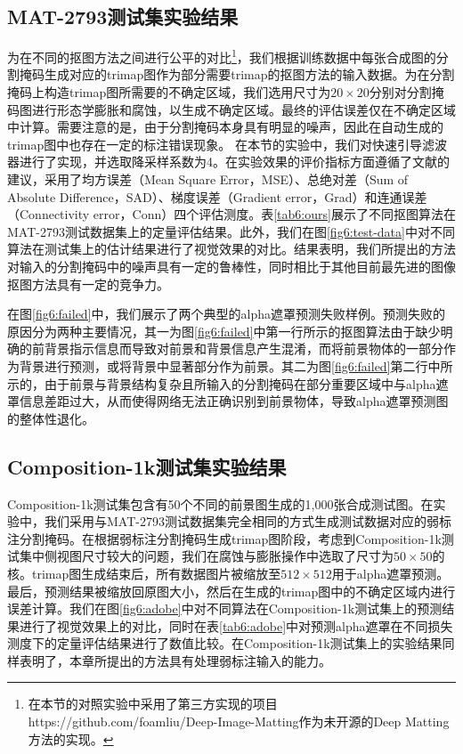 \subsection{MAT-2793测试集实验结果}
为在不同的抠图方法之间进行公平的对比\footnote{在本节的对照实验中采用了第三方实现的项目https://github.com/foamliu/Deep-Image-Matting作为未开源的Deep Matting方法的实现。}，我们根据训练数据中每张合成图的分割掩码生成对应的trimap图作为部分需要trimap的抠图方法的输入数据。为在分割掩码上构造trimap图所需要的不确定区域，我们选用尺寸为$20\times20$分别对分割掩码图进行形态学膨胀和腐蚀，以生成不确定区域。最终的评估误差仅在不确定区域中计算。需要注意的是，由于分割掩码本身具有明显的噪声，因此在自动生成的trimap图中也存在一定的标注错误现象。
在本节的实验中，我们对快速引导滤波器\cite{he2015fast}进行了实现，并选取降采样系数为4。在实验效果的评价指标方面遵循了文献\parencite{rhemann2009perceptually}的建议，采用了均方误差（Mean Square Error，MSE）、总绝对差（Sum of Absolute Difference，SAD）、梯度误差（Gradient error，Grad）和连通误差（Connectivity error，Conn）四个评估测度。表\ref{tab6:ours}展示了不同抠图算法在MAT-2793测试数据集上的定量评估结果。此外，我们在图\ref{fig6:test-data}中对不同算法在测试集上的估计结果进行了视觉效果的对比。结果表明，我们所提出的方法对输入的分割掩码中的噪声具有一定的鲁棒性，同时相比于其他目前最先进的图像抠图方法具有一定的竞争力。


在图\ref{fig6:failed}中，我们展示了两个典型的alpha遮罩预测失败样例。预测失败的原因分为两种主要情况，其一为图\ref{fig6:failed}中第一行所示的抠图算法由于缺少明确的前背景指示信息而导致对前景和背景信息产生混淆，而将前景物体的一部分作为背景进行预测，或将背景中显著部分作为前景。其二为图\ref{fig6:failed}第二行中所示的，由于前景与背景结构复杂且所输入的分割掩码在部分重要区域中与alpha遮罩信息差距过大，从而使得网络无法正确识别到前景物体，导致alpha遮罩预测图的整体性退化。

\subsection{Composition-1k测试集实验结果}
Composition-1k测试集\cite{xu2017deep}包含有50个不同的前景图生成的1,000张合成测试图。在实验中，我们采用与MAT-2793测试数据集完全相同的方式生成测试数据对应的弱标注分割掩码。在根据弱标注分割掩码生成trimap图阶段，考虑到Composition-1k测试集中侧视图尺寸较大的问题，我们在腐蚀与膨胀操作中选取了尺寸为$50\times50$的核。trimap图生成结束后，所有数据图片被缩放至$512\times512$用于alpha遮罩预测。最后，预测结果被缩放回原图大小，然后在生成的trimap图中的不确定区域内进行误差计算。我们在图\ref{fig6:adobe}中对不同算法在Composition-1k测试集上的预测结果进行了视觉效果上的对比，同时在表\ref{tab6:adobe}中对预测alpha遮罩在不同损失测度下的定量评估结果进行了数值比较。在Composition-1k测试集上的实验结果同样表明了，本章所提出的方法具有处理弱标注输入的能力。

